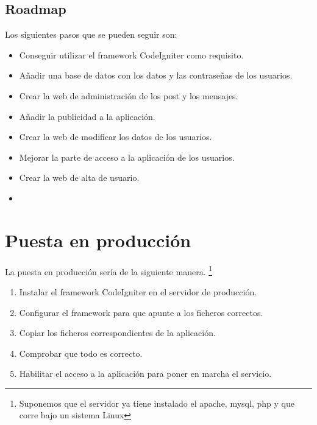 \documentclass[a4paper]{article}
\begin{document}
	\subsection{Roadmap}\label{mejoras}
	Los siguientes pasos que se pueden seguir son:
	\begin{itemize}
		\item Conseguir utilizar el framework CodeIgniter como requisito.
		\item Añadir una base de datos con los datos y las contraseñas de los usuarios.
		\item Crear la web de administración de los post y los mensajes.
		\item Añadir la publicidad a la aplicación.
		\item Crear la web de modificar los datos de los usuarios.
		\item Mejorar la parte de acceso a la aplicación de los usuarios.
		\item Crear la web de alta de usuario.
		\item 
	\end{itemize}
	
	\section{Puesta en producción}
	La puesta en producción sería de la siguiente manera. \footnote{Suponemos que el servidor ya tiene instalado el apache, mysql, php y que corre bajo un sistema Linux}
	\begin{enumerate}
		\item Instalar el framework CodeIgniter en el servidor de producción.
		\item Configurar el framework para que apunte a los ficheros correctos.
		\item Copiar los ficheros correspondientes de la aplicación.
		\item Comprobar que todo es correcto.
		\item Habilitar el acceso a la aplicación para poner en marcha  el servicio.
	\end{enumerate}
\end{document}
